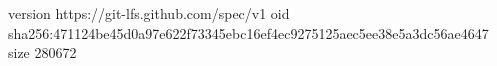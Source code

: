 version https://git-lfs.github.com/spec/v1
oid sha256:471124be45d0a97e622f73345ebc16ef4ec9275125aec5ee38e5a3dc56ae4647
size 280672
